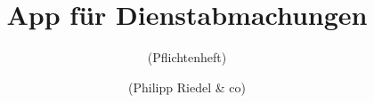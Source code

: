 

\newcommand{\trtitle}{App f\"ur Dienstabmachungen}


\title{\trtitle}
\subtitle{(Pflichtenheft)}
\author{(Philipp Riedel \& co)}

 
 



\maketitle


\tableofcontents
\thispagestyle{empty}
\newpage
{}




%





